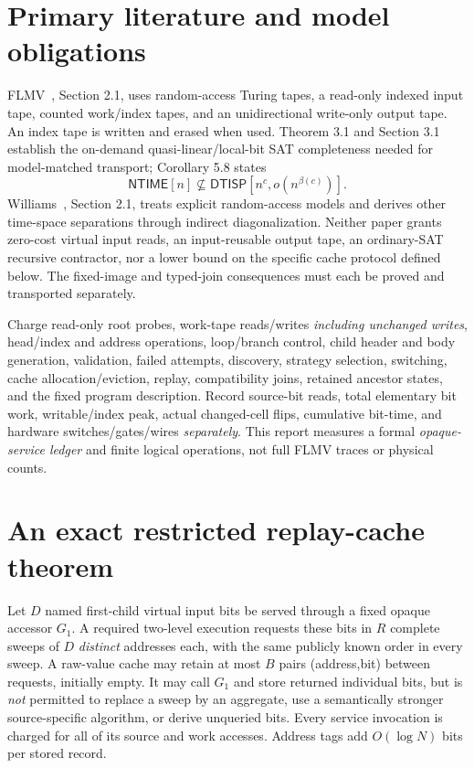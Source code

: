 \documentclass[11pt]{article}
\newcommand{\DTISP}{\mathsf{DTISP}}
\newcommand{\NTIME}{\mathsf{NTIME}}
\begin{document}
\section{Primary literature and model obligations}
FLMV~\cite{FLMV}, Section 2.1, uses random-access Turing tapes,
a read-only indexed input tape, counted work/index tapes, and an
unidirectional write-only output tape. An index tape is written and erased
when used. Theorem 3.1 and Section 3.1 establish the on-demand
quasi-linear/local-bit SAT completeness needed for model-matched
transport; Corollary 5.8 states
\[
\NTIME[n]\not\subseteq
\DTISP\left[n^c,o\!\left(n^{\beta(c)}\right)\right].
\]
Williams~\cite{Williams}, Section 2.1, treats explicit random-access
models and derives other time-space separations through indirect
diagonalization. Neither paper grants zero-cost virtual input reads,
an input-reusable output tape, an ordinary-SAT recursive contractor,
nor a lower bound on the specific cache protocol defined below.
The fixed-image and typed-join consequences must each be proved and
transported separately.

Charge read-only root probes, work-tape reads/writes \emph{including
unchanged writes}, head/index and address operations, loop/branch control,
child header and body generation, validation, failed attempts, discovery,
strategy selection, switching, cache allocation/eviction, replay,
compatibility joins, retained ancestor states, and the fixed program
description. Record source-bit reads, total elementary bit work,
writable/index peak, actual changed-cell flips, cumulative bit-time,
and hardware switches/gates/wires \emph{separately}. This report measures
a formal \emph{opaque-service ledger} and finite logical operations, not
full FLMV traces or physical counts.

\section{An exact restricted replay-cache theorem}
Let $D$ named first-child virtual input bits be served through a
fixed opaque accessor $G_1$. A required two-level execution requests
these bits in $R$ complete sweeps of $D$ \emph{distinct} addresses each,
with the same publicly known order in every sweep. A raw-value
cache may retain at most $B$ pairs (address,bit) between requests, initially
empty. It may call $G_1$ and store returned individual bits, but is
\emph{not} permitted to replace a sweep by an aggregate, use a
semantically stronger source-specific algorithm, or derive unqueried
bits. Every service invocation is charged for all of its source and
work accesses. Address tags add $O(\log N)$ bits per stored record.
\end{document}
